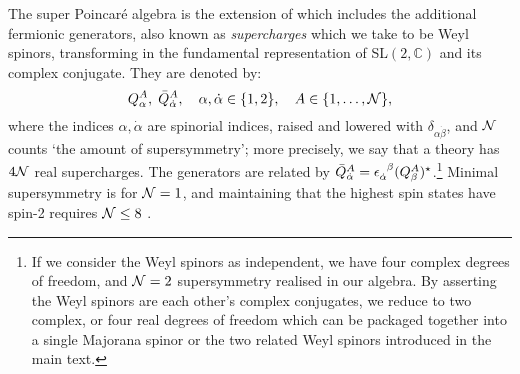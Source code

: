 The super Poincar\'e algebra is the extension of  which includes the additional fermionic generators, also known as \emph{supercharges} which we take to be Weyl spinors, transforming in the fundamental representation of SL$(2,\mathbb{C})$ and its complex conjugate. They are denoted by:
\begin{equation*}
	Q^A_{\alpha}, \; \bar{Q}^A_{\dot{\alpha}}, \quad \alpha, \dot{\alpha} \in \{1,2\}, \quad A \in \{1, \ldots, {\cal N}\},
\end{equation*}
where the indices $\alpha, \dot{\alpha}$ are spinorial indices, raised and lowered with $\delta_{\alpha \dot{\beta}}$, and ${\cal N}$ counts `the amount of supersymmetry'; more precisely, we say that a theory has $4{\cal N}$ real supercharges. The generators are related by $\bar{Q}^A_{\dot{\alpha}} = \tensor{\epsilon}{_{\dot{\alpha}}^\beta} (Q^A_\beta)^\star$.\footnote{If we consider the Weyl spinors as independent, we have four complex degrees of freedom, and ${\cal N} = 2$ supersymmetry realised in our algebra. By asserting the Weyl spinors are each other's complex conjugates, we reduce to two complex, or four real degrees of freedom which can be packaged together into a single Majorana spinor or the two related Weyl spinors introduced in the main text.} Minimal supersymmetry is for ${\cal N} = 1$, and maintaining that the highest spin states have spin-2 requires ${\cal N} \leq 8$ \cite{Nahm:1977tg}. 

